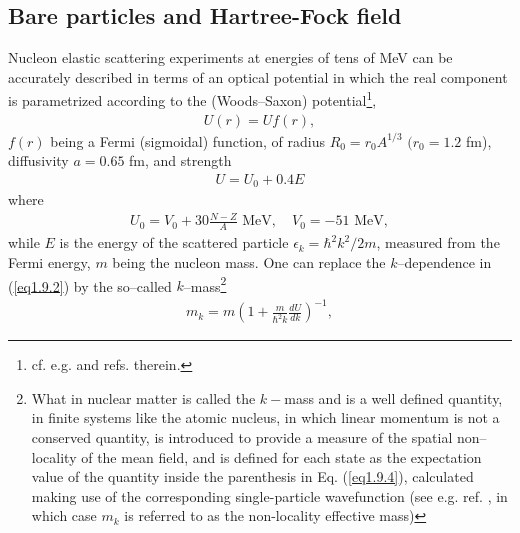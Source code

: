 \subsection{Bare particles and Hartree-Fock field}\label{S1.9.1}
Nucleon elastic scattering experiments at energies of tens of MeV can be accurately described in terms of an optical potential in which the real component is parametrized according to the (Woods--Saxon) potential\footnote{cf. e.g. \cite{Bohr:69} and refs. therein.},
\begin{align}
U(r)=Uf(r),
\end{align}
$f(r)$ being a Fermi (sigmoidal) function, of radius $R_0=r_0A^{1/3}$ $(r_0=1.2$ fm), diffusivity $a=0.65$ fm, and strength 
\begin{align}\label{eq1.9.2}
U=U_0+0.4 E
\end{align}
where 
\begin{align}\label{eq1.9.3}
U_0=V_0+30\frac{N-Z}{A}\text{ MeV},\quad V_0=-51\text{ MeV},
\end{align}
while $E$ is the energy of the scattered particle $\epsilon_k=\hbar^2k^2/2m$, measured from the Fermi energy, $m$ being the nucleon mass. One can replace the $k$--dependence in (\ref{eq1.9.2}) by the so--called $k$--mass\footnote{What in nuclear matter is called the $k-$mass  and is a well defined quantity, in finite systems like the atomic nucleus, in which linear momentum is not
a conserved quantity,  is introduced to provide a measure of the spatial non--locality of the mean field, and is defined for each state 
as the expectation value of the quantity inside the parenthesis in Eq. (\ref{eq1.9.4}), calculated making use of the corresponding single-particle wavefunction 
(see e.g. ref. \cite{Bernard:81}, in which case $m_k$ is referred to as the non-locality effective mass)}
\begin{align}\label{eq1.9.4}
m_k=m\left(1+\frac{m}{\hbar^2k}\frac{dU}{dk}\right)^{-1},
\end{align}
